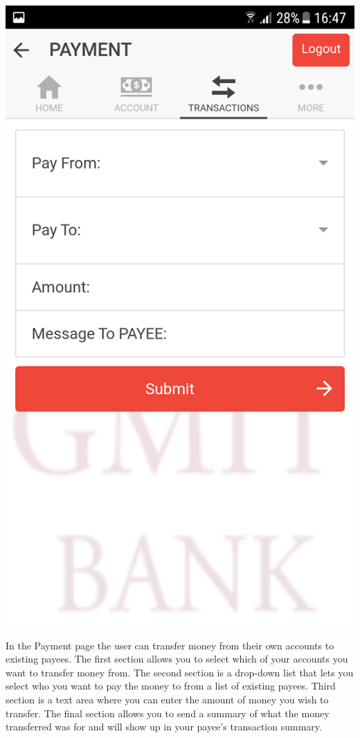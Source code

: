 \begin{center}    
    \includegraphics[scale=0.5]{img/11transferempty.png}
\end{center}
In the Payment page the user can transfer money from their own accounts to existing payees. The first section allows you to select which of your accounts you want to transfer money from. The second section is a drop-down list that lets you select who you want to pay the money to from a list of existing payees. Third section is a text area where you can enter the amount of money you wish to transfer. The final section allows you to send a summary of what the money transferred was for and will show up in your payee’s transaction summary. \paragraph{}
